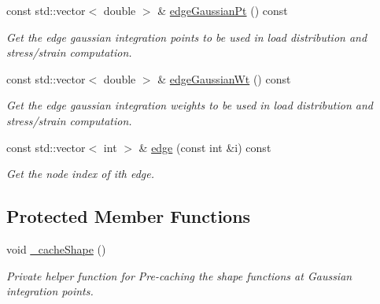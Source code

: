 \begin{DoxyCompactItemize}
const std\+::vector$<$ double $>$ \& \mbox{\hyperlink{class_shape_af004504284fc26fee888906a13a6fab2}{edge\+Gaussian\+Pt}} () const
\begin{DoxyCompactList}\small\item\em Get the edge gaussian integration points to be used in load distribution and stress/strain computation. \end{DoxyCompactList}\item 
const std\+::vector$<$ double $>$ \& \mbox{\hyperlink{class_shape_a651a829c004900fe28c9bdadf0939306}{edge\+Gaussian\+Wt}} () const
\begin{DoxyCompactList}\small\item\em Get the edge gaussian integration weights to be used in load distribution and stress/strain computation. \end{DoxyCompactList}\item 
const std\+::vector$<$ int $>$ \& \mbox{\hyperlink{class_shape_a3d0c3331bae4cad90eb8b5de8f095140}{edge}} (const int \&i) const
\begin{DoxyCompactList}\small\item\em Get the node index of ith edge. \end{DoxyCompactList}\end{DoxyCompactItemize}
\subsection*{Protected Member Functions}
\begin{DoxyCompactItemize}
\item 
\mbox{\label{class_shape_aea3b1ebc3bc64d488e8d55877fcd5ec7}} 
void \mbox{\hyperlink{class_shape_aea3b1ebc3bc64d488e8d55877fcd5ec7}{\+\_\+cache\+Shape}} ()
\begin{DoxyCompactList}\small\item\em Private helper function for Pre-\/caching the shape functions at Gaussian integration points. \end{DoxyCompactList}\end{DoxyCompactItemize}
